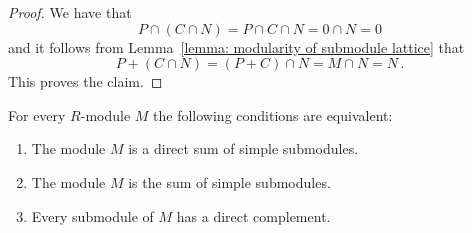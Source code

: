 \begin{proof}
  We have that
  \[
      P \cap (C \cap N)
    = P \cap C \cap N
    = 0 \cap N
    = 0
  \]
  and it follows from Lemma~\ref{lemma: modularity of submodule lattice} that
  \[
      P + (C \cap N)
    = (P + C) \cap N
    = M \cap N
    = N \,.
  \]
  This proves the claim.
\end{proof}


\begin{proposition}
  \label{proposition: characterisation semisimple modules}
  For every $R$-module $M$ the following conditions are equivalent:
  \begin{enumerate}
    \item
      \label{enumerate: direct sum of simple}
      The module $M$ is a direct sum of simple submodules. 
    \item
      \label{enumerate: sum of simple}
      The module $M$ is the sum of simple submodules.
    \item
      \label{enumerate: direct complements}
      Every submodule of $M$ has a direct complement.
  \end{enumerate}
\end{proposition}


